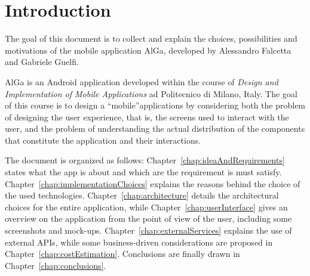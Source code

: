 \chapter{Introduction}
The goal of this document is to collect and explain the choices, possibilities and motivations of the mobile application AlGa, developed by Alessandro Falcetta and Gabriele Guelfi.

AlGa is an Android application developed within the course of \textit{Design and Implementation of Mobile Applications} ad Politecnico di Milano, Italy. The goal of this course is to design a ``mobile''applications by considering both the problem of designing the user experience, that is, the screens used to interact with the user, and the problem of understanding the actual distribution of the components that constitute the application and their interactions.

The document is organized as follows: Chapter~\ref{chap:ideaAndRequirements} states what the app is about and which are the requirement is must satisfy. Chapter~\ref{chap:implementationChoices} explains the reasons behind the choice of the used technologies. Chapter~\ref{chap:architecture} details the architectural choices for the entire application, while Chapter~\ref{chap:userInterface} gives an overview on the application from the point of view of the user, including some screenshots and mock-ups. Chapter~\ref{chap:externalServices} explains the use of external APIs, while some business-driven considerations are proposed in Chapter~\ref{chap:costEstimation}. Conclusions are finally drawn in Chapter~\ref{chap:conclusions}.
